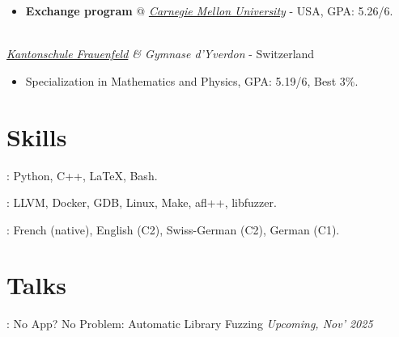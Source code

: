 \documentclass[mm, 11pt]{simple_style}
\begin{document}
\begin{resume}
\begin{itemize}
  \item \textbf{Exchange program} @
\textit{\href{https://www.ece.cmu.edu/}{Carnegie Mellon University}} - USA, GPA: 5.26/6.
\end{itemize}
\\
\textsl{\href{https://www.kanti-frauenfeld.ch/}{Kantonschule Frauenfeld} \& Gymnase d'Yverdon} - Switzerland

\begin{itemize}
  \item Specialization in Mathematics and Physics, GPA: 5.19/6, Best 3\%.
\end{itemize}

\sectionline
\section{Skills}
: Python, C++, \LaTeX, Bash.

: LLVM, Docker, GDB, Linux, Make, afl++, libfuzzer.

: French (native), English (C2), Swiss-German (C2), German (C1).\\
\sectionline
\section{Talks}
: No App? No Problem: Automatic Library Fuzzing
\hfill
\textit{Upcoming, Nov' 2025}

\pagebreak
\sectionline

\end{resume}
\end{document}
